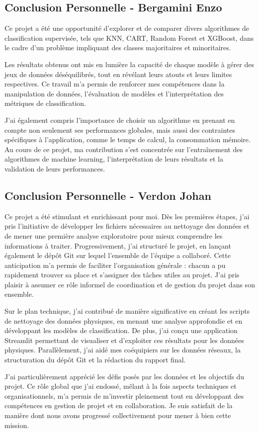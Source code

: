 \subsection*{Conclusion Personnelle - Bergamini Enzo}

Ce projet a été une opportunité d’explorer et de comparer divers algorithmes de classification supervisée, tels que KNN, CART, Random Forest et XGBoost, dans le cadre d’un problème impliquant des classes majoritaires et minoritaires. 

Les résultats obtenus ont mis en lumière la capacité de chaque modèle à gérer des jeux de données déséquilibrés, tout en révélant leurs atouts et leurs limites respectives. Ce travail m’a permis de renforcer mes compétences dans la manipulation de données, l’évaluation de modèles et l’interprétation des métriques de classification. 

J’ai également compris l’importance de choisir un algorithme en prenant en compte non seulement ses performances globales, mais aussi des contraintes spécifiques à l’application, comme le temps de calcul, la consommation mémoire. Au cours de ce projet, ma contribution s’est concentrée sur l’entraînement des algorithmes de machine learning, l’interprétation de leurs résultats et la validation de leurs performances.

\subsection*{Conclusion Personnelle - Verdon Johan}

Ce projet a été stimulant et enrichissant pour moi. Dès les premières étapes, j’ai pris l’initiative de développer les fichiers nécessaires au nettoyage des données et de mener une première analyse exploratoire pour mieux comprendre les informations à traiter. Progressivement, j’ai structuré le projet, en lançant également le dépôt Git sur lequel l’ensemble de l’équipe a collaboré. Cette anticipation m’a permis de faciliter l’organisation générale : chacun a pu rapidement trouver sa place et s’assigner des tâches utiles au projet. J’ai pris plaisir à assumer ce rôle informel de coordination et de gestion du projet dans son ensemble.

Sur le plan technique, j’ai contribué de manière significative en créant les scripts de nettoyage des données physiques, en menant une analyse approfondie et en développant les modèles de classification. De plus, j’ai conçu une application Streamlit permettant de visualiser et d’exploiter ces résultats pour les données physiques. Parallèlement, j’ai aidé mes coéquipiers sur les données réseaux, la structuration du dépôt Git et la rédaction du rapport final.

J’ai particulièrement apprécié les défis posés par les données et les objectifs du projet. Ce rôle global que j’ai endossé, mêlant à la fois aspects techniques et organisationnels, m’a permis de m’investir pleinement tout en développant des compétences en gestion de projet et en collaboration. Je suis satisfait de la manière dont nous avons progressé collectivement pour mener à bien cette mission.
